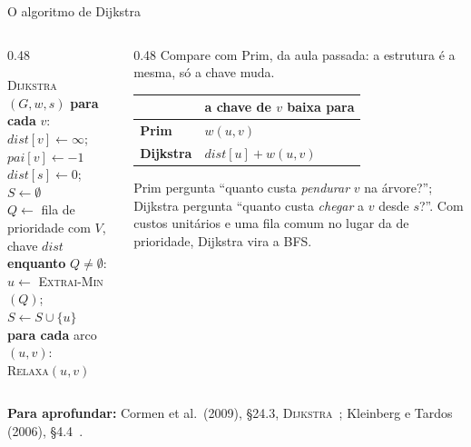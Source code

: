 \documentclass[aspectratio=169,xcolor=table]{beamer}
\newcommand{\fonte}[1]{%
  \vfill
  {\tiny\color{gray!55!black}\textbf{Para aprofundar:} #1\par}%
}
\begin{document}
\begin{frame}{O algoritmo de Dijkstra}
  \begin{columns}[c]
    \begin{column}{0.48\textwidth}
      \begin{block}{\textsc{Dijkstra}$(G, w, s)$}
        \small
        \textbf{para cada} $v$: $\mathit{dist}[v] \gets \infty$; $\mathit{pai}[v] \gets -1$\\
        $\mathit{dist}[s] \gets 0$;\ $S \gets \emptyset$\\
        $Q \gets$ fila de prioridade com $V$, chave $\mathit{dist}$\\
        \textbf{enquanto} $Q \neq \emptyset$:\\
        \quad $u \gets$ \textsc{Extrai-Min}$(Q)$;\ $S \gets S \cup \{u\}$\\
        \quad \textbf{para cada} arco $(u,v)$:\\
        \quad\quad \textsc{Relaxa}$(u,v)$
      \end{block}
    \end{column}
    \begin{column}{0.48\textwidth}
      \scriptsize
      Compare com Prim, da aula passada: a estrutura é a mesma, só a chave muda.
      \medskip

      \begin{tabular}{lp{3.6cm}}
        \toprule
        & a chave de $v$ baixa para \\
        \midrule
        \textbf{Prim} & $w(u,v)$ \\
        \addlinespace
        \textbf{Dijkstra} & $\mathit{dist}[u] + w(u,v)$ \\
        \bottomrule
      \end{tabular}
      \medskip

      Prim pergunta ``quanto custa \emph{pendurar} $v$ na árvore?''; Dijkstra pergunta
      ``quanto custa \emph{chegar} a $v$ desde $s$?''. Com custos unitários e uma fila comum
      no lugar da de prioridade, Dijkstra vira a BFS.
    \end{column}
  \end{columns}
  \fonte{Cormen et al.\ (2009), \S 24.3, \textsc{Dijkstra}~\cite{cormen2009introduction};
    Kleinberg e Tardos (2006), \S 4.4~\cite{kleinberg2006algorithm}.}
\end{frame}
\end{document}
